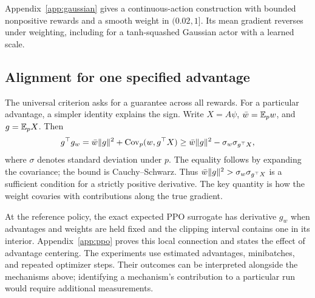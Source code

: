 Appendix~\ref{app:gaussian} gives a continuous-action construction with bounded nonpositive rewards and a smooth weight in $(0.02,1]$. Its mean gradient reverses under weighting, including for a tanh-squashed Gaussian actor with a learned scale.

\subsection{Alignment for one specified advantage}

The universal criterion asks for a guarantee across all rewards. For a particular advantage, a simpler identity explains the sign. Write $X=A\psi$, $\bar w=\mathbb{E}_p w$, and $g=\mathbb{E}_pX$. Then
\begin{equation}
g^\top g_w=\bar w\lVert g\rVert^2+\operatorname{Cov}_p(w,g^\top X)
\ge\bar w\lVert g\rVert^2-\sigma_w\sigma_{g^\top X},
\label{eq:covariance-alignment}
\end{equation}
where $\sigma$ denotes standard deviation under $p$. The equality follows by expanding the covariance; the bound is Cauchy--Schwarz. Thus $\bar w\lVert g\rVert^2>\sigma_w\sigma_{g^\top X}$ is a sufficient condition for a strictly positive derivative. The key quantity is how the weight covaries with contributions along the true gradient.

At the reference policy, the exact expected PPO surrogate has derivative $g_w$ when advantages and weights are held fixed and the clipping interval contains one in its interior. Appendix~\ref{app:ppo} proves this local connection and states the effect of advantage centering. The experiments use estimated advantages, minibatches, and repeated optimizer steps. Their outcomes can be interpreted alongside the mechanisms above; identifying a mechanism's contribution to a particular run would require additional measurements.
